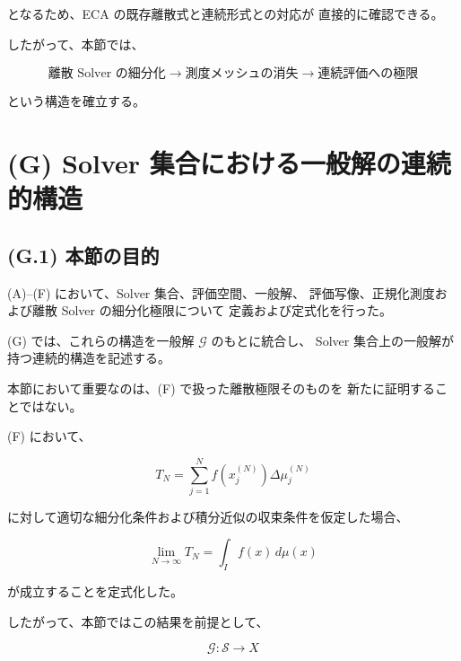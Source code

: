 \documentclass[a4paper,11pt]{article}
\begin{document}
となるため、ECA の既存離散式と連続形式との対応が
直接的に確認できる。

したがって、本節では、

\begin{equation}
    \boxed{
        \text{離散 Solver の細分化}
        \longrightarrow
        \text{測度メッシュの消失}
        \longrightarrow
        \text{連続評価への極限}
    }
\end{equation}

という構造を確立する。


\section{(G) Solver 集合における一般解の連続的構造}
\label{sec:G}

\subsection{(G.1) 本節の目的}
\label{subsec:G1}

(A)--(F) において、Solver 集合、評価空間、一般解、
評価写像、正規化測度および離散 Solver の細分化極限について
定義および定式化を行った。

(G) では、これらの構造を一般解 $\mathcal{G}$ のもとに統合し、
Solver 集合上の一般解が持つ連続的構造を記述する。

本節において重要なのは、(F) で扱った離散極限そのものを
新たに証明することではない。

(F) において、

\begin{equation}
    T_N
    =
    \sum_{j=1}^{N}
    f\!\left(x_j^{(N)}\right)
    \Delta\mu_j^{(N)}
\end{equation}

に対して適切な細分化条件および積分近似の収束条件を仮定した場合、

\begin{equation}
    \lim_{N\to\infty}T_N
    =
    \int_I f(x)\,d\mu(x)
\end{equation}

が成立することを定式化した。

したがって、本節ではこの結果を前提として、

\begin{equation}
    \mathcal{G}:\mathcal{S}\longrightarrow X
\end{equation}
\end{document}
